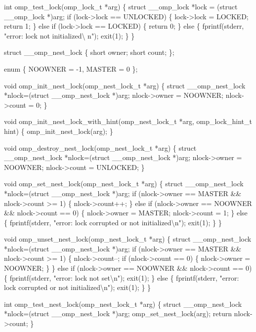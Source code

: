 {\begin{codepar}
int omp\_test\_lock(omp\_lock\_t *arg)
\{
    struct \_\_omp\_lock *lock = (struct \_\_omp\_lock *)arg;
    if (lock->lock == UNLOCKED)
    \{
        lock->lock = LOCKED;
        return 1;
    \}
    else if (lock->lock == LOCKED)
    \{
        return 0;
    \}
    else
    \{
        fprintf(stderr, "error: lock not initialized{\textbackslash} n");
        exit(1);
    \}
\}

struct \_\_omp\_nest\_lock
\{
    short owner;
    short count;
\};

enum \{ NOOWNER = -1, MASTER = 0 \};

void omp\_init\_nest\_lock(omp\_nest\_lock\_t *arg)
\{
    struct \_\_omp\_nest\_lock *nlock=(struct \_\_omp\_nest\_lock *)arg;
    nlock->owner = NOOWNER;
    nlock->count = 0;
\}

void omp\_init\_nest\_lock\_with\_hint(omp\_nest\_lock\_t *arg, 
                                  omp\_lock\_hint\_t hint)
\{
    omp\_init\_nest\_lock(arg);
\}

void omp\_destroy\_nest\_lock(omp\_nest\_lock\_t *arg)
\{
    struct \_\_omp\_nest\_lock *nlock=(struct \_\_omp\_nest\_lock *)arg;
    nlock->owner = NOOWNER;
    nlock->count = UNLOCKED;
\}

void omp\_set\_nest\_lock(omp\_nest\_lock\_t *arg)
\{
    struct \_\_omp\_nest\_lock *nlock=(struct \_\_omp\_nest\_lock *)arg;
    if (nlock->owner == MASTER \&\& nlock->count >= 1)
    \{
        nlock->count++;
    \}
    else if (nlock->owner == NOOWNER \&\& nlock->count == 0)
    \{
        nlock->owner = MASTER;
        nlock->count = 1;
    \}
    else
    \{
        fprintf(stderr, "error: lock corrupted or not initialized{\textbackslash}n");
        exit(1);
    \}
\}

void omp\_unset\_nest\_lock(omp\_nest\_lock\_t *arg)
\{
    struct \_\_omp\_nest\_lock *nlock=(struct \_\_omp\_nest\_lock *)arg;
    if (nlock->owner == MASTER \&\& nlock->count >= 1)
    \{
        nlock->count--;
        if (nlock->count == 0)
        \{
            nlock->owner = NOOWNER;
        \}
    \}
    else if (nlock->owner == NOOWNER \&\& nlock->count == 0)
    \{
        fprintf(stderr, "error: lock not set{\textbackslash}n");
        exit(1);
    \}
    else
    \{
        fprintf(stderr, "error: lock corrupted or not initialized{\textbackslash}n");
        exit(1);
    \}
\}

int omp\_test\_nest\_lock(omp\_nest\_lock\_t *arg)
\{
    struct \_\_omp\_nest\_lock *nlock=(struct \_\_omp\_nest\_lock *)arg;
    omp\_set\_nest\_lock(arg);
    return nlock->count;
\}


\end{codepar}}
